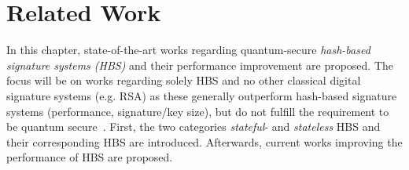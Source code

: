 \chapter{Related Work}
\label{cha:stateOfTheArt}

In this chapter, state-of-the-art works regarding quantum-secure \textit{hash-based signature systems (HBS)} and their performance improvement are proposed. 
The focus will be on works regarding solely HBS and no other classical digital signature systems (e.g. RSA) as these generally outperform hash-based signature systems (performance, signature/key size), but do not fulfill the requirement to be quantum secure~\cite{RSA_pq-attack_examples_2018,comparison_performance_RSA_ECDSA_Merkle_WOTS_2021}.
First, the two categories \textit{stateful}- and \textit{stateless} HBS and their corresponding HBS are introduced. Afterwards, current works improving the performance of HBS are proposed.

